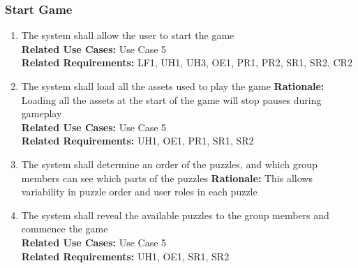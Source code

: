 \documentclass[12pt]{article}
\begin{document}
\subsubsection{Start Game}
\begin{enumerate}[label=ST\arabic*., series=StartGame]
	\item The system shall allow the user to start the game\\
    \textbf{Related Use Cases:} Use Case 5\\
    \textbf{Related Requirements:} LF1, UH1, UH3, OE1, PR1, PR2, SR1, SR2, CR2
    \item The system shall load all the assets used to play the game\newline 
    \textbf{Rationale:} Loading all the assets at the start of the game will stop pauses during gameplay\\
    \textbf{Related Use Cases:} Use Case 5\\
    \textbf{Related Requirements:} UH1, OE1, PR1, SR1, SR2
    \item The system shall determine an order of the puzzles, and which group members can see which parts of the puzzles\newline 
    \textbf{Rationale:} This allows variability in puzzle order and user roles in each puzzle
    \item The system shall reveal the available puzzles to the group members and commence the game\\
    \textbf{Related Use Cases:} Use Case 5\\
    \textbf{Related Requirements:} UH1, OE1, SR1, SR2
\end{enumerate}
\end{document}
